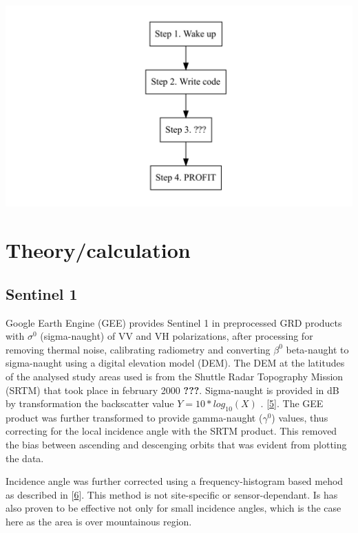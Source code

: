 \documentclass[]{elsarticle} %
\makeatletter
\def\maxwidth{\ifdim\Gin@nat@width>\linewidth\linewidth
\else\Gin@nat@width\fi}
\let\Oldincludegraphics\includegraphics
\renewcommand{\includegraphics}[1]{\Oldincludegraphics[width=\maxwidth]{#1}}
\makeatother
\begin{document}
\includegraphics{paper2_files/figure-latex/unnamed-chunk-1-1.pdf}

\hypertarget{theorycalculation}{%
\section{Theory/calculation}\label{theorycalculation}}

\hypertarget{sentinel-1}{%
\subsection{Sentinel 1}\label{sentinel-1}}

Google Earth Engine (GEE) provides Sentinel 1 in preprocessed GRD
products with \(\sigma^0\) (sigma-naught) of VV and VH polarizations,
after processing for removing thermal noise, calibrating radiometry and
converting \(\beta^0\) beta-naught to sigma-naught using a digital
elevation model (DEM). The DEM at the latitudes of the analysed study
areas used is from the Shuttle Radar Topography Mission (SRTM) that took
place in february 2000 \textbf{???}. Sigma-naught is provided in dB by
transformation the backscatter value \(Y=10*log_{10}(X)\) .
{[}\protect\hyperlink{ref-Small2011}{5}{]}. The GEE product was further
transformed to provide gamma-naught (\(\gamma^0\)) values, thus
correcting for the local incidence angle with the SRTM product. This
removed the bias between ascending and descenging orbits that was
evident from plotting the data.

Incidence angle was further corrected using a frequency-histogram based
mehod as described in {[}\protect\hyperlink{ref-Mladenova2013}{6}{]}.
This method is not site-specific or sensor-dependant. Is has also proven
to be effective not only for small incidence angles, which is the case
here as the area is over mountainous region.
\end{document}
